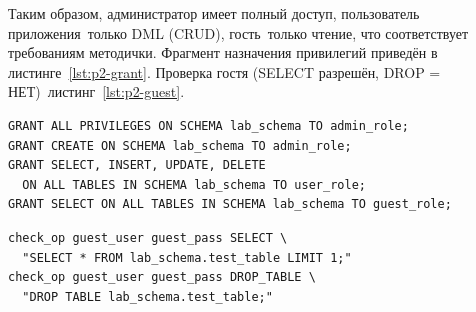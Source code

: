 Таким образом, администратор имеет полный доступ, пользователь приложения~\mdash  только DML (CRUD), гость~\mdash  только чтение, что соответствует требованиям методички. Фрагмент назначения привилегий приведён в листинге~\ref{lst:p2-grant}. Проверка гостя (SELECT разрешён, DROP = НЕТ)~\mdash  листинг~\ref{lst:p2-guest}.

\begin{lstlisting}[caption={Назначение привилегий ролям},label={lst:p2-grant}]
GRANT ALL PRIVILEGES ON SCHEMA lab_schema TO admin_role;
GRANT CREATE ON SCHEMA lab_schema TO admin_role;
GRANT SELECT, INSERT, UPDATE, DELETE
  ON ALL TABLES IN SCHEMA lab_schema TO user_role;
GRANT SELECT ON ALL TABLES IN SCHEMA lab_schema TO guest_role;
\end{lstlisting}

\begin{lstlisting}[caption={Проверка гостя: SELECT разрешён, DROP ожидается как отказ},label={lst:p2-guest}]
check_op guest_user guest_pass SELECT \
  "SELECT * FROM lab_schema.test_table LIMIT 1;"
check_op guest_user guest_pass DROP_TABLE \
  "DROP TABLE lab_schema.test_table;"
\end{lstlisting}
